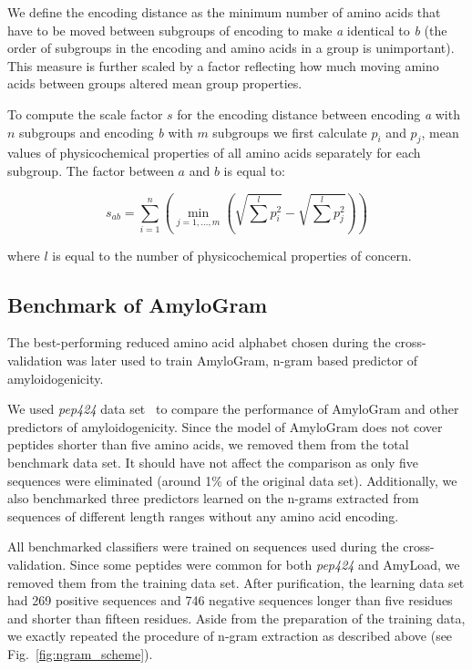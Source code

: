 \documentclass[a4,center,fleqn]{NAR}
\begin{document}
  We define the encoding distance as the minimum number of amino acids that 
have to be moved between subgroups of encoding to make \textit{a} identical to 
\textit{b} (the order of subgroups in the encoding and amino acids in a group 
is unimportant). This measure is further scaled by a factor reflecting how 
much moving amino acids between groups altered mean group properties. 

To compute the scale factor $s$ for the encoding distance between 
encoding \textit{a} with $n$ subgroups and encoding \textit{b} with $m$ 
subgroups we first calculate $p_i$ and $p_j$, mean values of physicochemical 
properties of all amino acids separately for each subgroup. The factor between 
%
%
%
$a$ and $b$ is equal to: 

$$
s_{ab} = \sum^n_{i = 1}  \left( \min_{j=1,\dots,m} \left(\sqrt{\sum^l p_{i}^2} 
- \sqrt{\sum^l p_{j}^2} \right) \right)
$$
 
where $l$ is equal to the number of physicochemical properties of concern.

\subsection{Benchmark of AmyloGram}

The best-performing reduced amino acid alphabet chosen during the 
cross-validation was later used to train AmyloGram, n-gram based predictor of 
amyloidogenicity.

  We used \textit{pep424} data set~\citep{walsh_pasta_2014} to compare the 
performance of AmyloGram and other predictors of amyloidogenicity. Since the 
model of AmyloGram does not cover peptides shorter than five amino acids, we 
removed them from the total benchmark data set. It should have not affect the 
comparison as only five sequences were eliminated (around 1\% of the original 
data set). Additionally, we also benchmarked three predictors learned on the 
n-grams extracted from sequences of different length ranges without any amino 
acid encoding.

  All benchmarked classifiers were trained on sequences used during the 
cross-validation. Since some peptides were common for both \textit{pep424} and 
AmyLoad, we removed them from the training data set. After purification, the 
learning data set had 269 positive sequences and 746 negative sequences longer 
than five residues and shorter than fifteen residues. Aside from the 
preparation of the training data, we exactly repeated the procedure of n-gram 
extraction as described above (see Fig.~\ref{fig:ngram_scheme}). 
\end{document}
